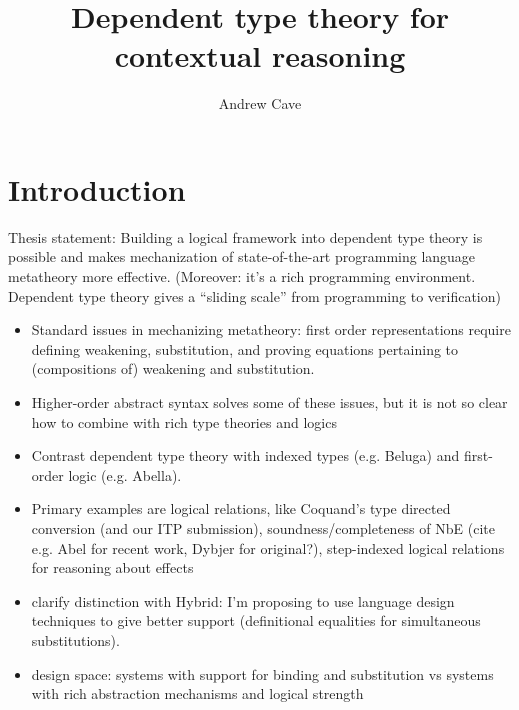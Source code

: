 \documentclass{article}
\author{Andrew Cave}
\title{Dependent type theory for contextual reasoning}
\begin{document}
\maketitle

\section{Introduction}
Thesis statement: Building a logical framework into dependent type
theory is possible and makes mechanization of state-of-the-art programming
language metatheory more effective. (Moreover: it's a rich programming
environment. Dependent type theory gives a ``sliding scale'' from
programming to verification)

\begin{itemize}
\item Standard issues in mechanizing metatheory: first order
  representations require defining weakening, substitution, and proving
  equations pertaining to (compositions of) weakening and
  substitution.
\item Higher-order abstract syntax solves some of these issues, but it
  is not so clear how to combine with rich type theories and logics
\item Contrast dependent type theory with indexed types (e.g. Beluga) and first-order
logic (e.g. Abella). 

\item Primary examples are logical relations, like Coquand's type
directed conversion (and our ITP submission), soundness/completeness of NbE
(cite e.g. Abel for recent work, Dybjer for original?),
step-indexed logical relations for reasoning about effects

\item clarify distinction with Hybrid: I'm proposing to use language design
techniques to give better support (definitional equalities for
simultaneous substitutions).

\item design space: systems with support for binding and substitution vs
systems with rich abstraction mechanisms and logical strength





\end{itemize}
\end{document}
